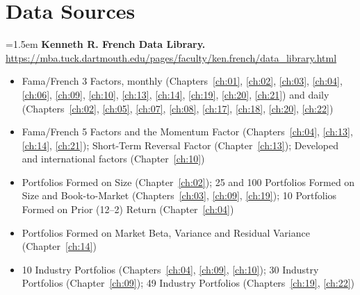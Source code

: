 \chapter*{Data Sources}
\label{datasources}


\begingroup
\small
\sloppy
\setlength{\parindent}{0pt}
\setlength{\parskip}{4pt}

\hangindent=1.5em \textbf{Kenneth R. French Data Library.} \url{https://mba.tuck.dartmouth.edu/pages/faculty/ken.french/data_library.html}
\begin{itemize}\setlength{\itemsep}{0pt}\setlength{\parskip}{0pt}
  \item Fama/French 3 Factors, monthly (Chapters~\ref{ch:01}, \ref{ch:02}, \ref{ch:03}, \ref{ch:04}, \ref{ch:06}, \ref{ch:09}, \ref{ch:10}, \ref{ch:13}, \ref{ch:14}, \ref{ch:19}, \ref{ch:20}, \ref{ch:21}) and daily (Chapters~\ref{ch:02}, \ref{ch:05}, \ref{ch:07}, \ref{ch:08}, \ref{ch:17}, \ref{ch:18}, \ref{ch:20}, \ref{ch:22})
  \item Fama/French 5 Factors and the Momentum Factor (Chapters~\ref{ch:04}, \ref{ch:13}, \ref{ch:14}, \ref{ch:21}); Short-Term Reversal Factor (Chapter~\ref{ch:13}); Developed and international factors (Chapter~\ref{ch:10})
  \item Portfolios Formed on Size (Chapter~\ref{ch:02}); 25 and 100 Portfolios Formed on Size and Book-to-Market (Chapters~\ref{ch:03}, \ref{ch:09}, \ref{ch:19}); 10 Portfolios Formed on Prior (12--2) Return (Chapter~\ref{ch:04})
  \item Portfolios Formed on Market Beta, Variance and Residual Variance (Chapter~\ref{ch:14})
  \item 10 Industry Portfolios (Chapters~\ref{ch:04}, \ref{ch:09}, \ref{ch:10}); 30 Industry Portfolios (Chapter~\ref{ch:09}); 49 Industry Portfolios (Chapters~\ref{ch:19}, \ref{ch:22})
\end{itemize}

